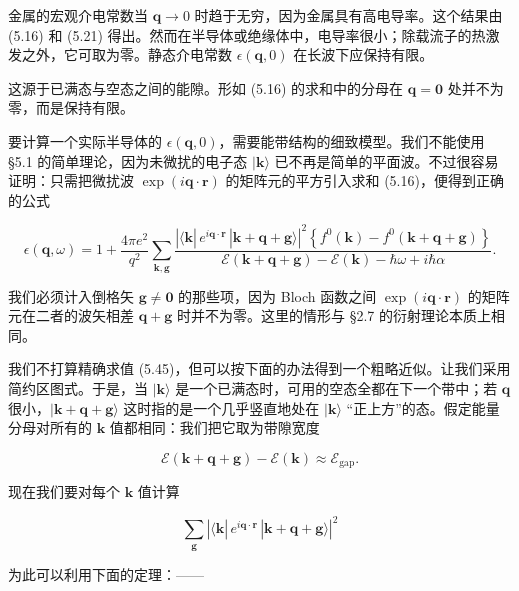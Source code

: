 金属的宏观介电常数当 $\mathbf{q} \to 0$ 时趋于无穷，因为金属具有高电导率。这个结果由 (5.16) 和 (5.21) 得出。然而在半导体或绝缘体中，电导率很小；除载流子的热激发之外，它可取为零。静态介电常数 $\epsilon(\mathbf{q},0)$ 在长波下应保持有限。

这源于已满态与空态之间的能隙。形如 (5.16) 的求和中的分母在 $\mathbf{q} = \mathbf{0}$ 处并不为零，而是保持有限。

要计算一个实际半导体的 $\epsilon(\mathbf{q},0)$，需要能带结构的细致模型。我们不能使用 §5.1 的简单理论，因为未微扰的电子态 $|\mathbf{k}\rangle$ 已不再是简单的平面波。不过很容易证明：只需把微扰波 $\exp(i\mathbf{q}\cdot\mathbf{r})$ 的矩阵元的平方引入求和 (5.16)，便得到正确的公式

\begin{equation*}
\epsilon(\mathbf{q},\omega) = 1 + \frac{4\pi e^2}{q^2} \sum_{\mathbf{k},\mathbf{g}} \frac{\left| \langle \mathbf{k}|\, e^{i\mathbf{q}\cdot\mathbf{r}}\, |\mathbf{k}+\mathbf{q}+\mathbf{g}\rangle \right|^2 \left\{ f^0(\mathbf{k}) - f^0(\mathbf{k}+\mathbf{q}+\mathbf{g}) \right\}}{\mathcal{E}(\mathbf{k}+\mathbf{q}+\mathbf{g}) - \mathcal{E}(\mathbf{k}) - \hbar\omega + i\hbar\alpha} .
\tag{5.45}
\end{equation*}

我们必须计入倒格矢 $\mathbf{g} \neq \mathbf{0}$ 的那些项，因为 Bloch 函数之间 $\exp(i\mathbf{q}\cdot\mathbf{r})$ 的矩阵元在二者的波矢相差 $\mathbf{q}+\mathbf{g}$ 时并不为零。这里的情形与 §2.7 的衍射理论本质上相同。

我们不打算精确求值 (5.45)，但可以按下面的办法得到一个粗略近似。让我们采用简约区图式。于是，当 $|\mathbf{k}\rangle$ 是一个已满态时，可用的空态全都在下一个带中；若 $\mathbf{q}$ 很小，$|\mathbf{k}+\mathbf{q}+\mathbf{g}\rangle$ 这时指的是一个几乎竖直地处在 $|\mathbf{k}\rangle$ “正上方”的态。假定能量分母对所有的 $\mathbf{k}$ 值都相同：我们把它取为带隙宽度

\begin{equation*}
\mathcal{E}(\mathbf{k}+\mathbf{q}+\mathbf{g}) - \mathcal{E}(\mathbf{k}) \approx \mathcal{E}_{\mathrm{gap}} .
\tag{5.46}
\end{equation*}

现在我们要对每个 $\mathbf{k}$ 值计算

\begin{equation*}
\sum_{\mathbf{g}} \left| \langle \mathbf{k}|\, e^{i\mathbf{q}\cdot\mathbf{r}}\, |\mathbf{k}+\mathbf{q}+\mathbf{g}\rangle \right|^2
\tag{5.47}
\end{equation*}

为此可以利用下面的定理：——


